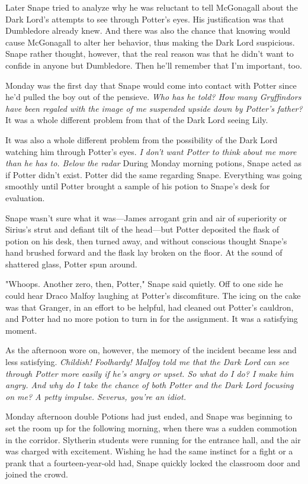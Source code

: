 Later Snape tried to analyze why he was reluctant to tell McGonagall about the Dark Lord's attempts to see through Potter's eyes. His justification was that Dumbledore already knew. And there was also the chance that knowing would cause McGonagall to alter her behavior, thus making the Dark Lord suspicious. Snape rather thought, however, that the real reason was that he didn't want to confide in anyone but Dumbledore. Then he'll remember that I'm important, too.

Monday was the first day that Snape would come into contact with Potter since he'd pulled the boy out of the pensieve. \emph{Who has he told? How many Gryffindors have been regaled with the image of me suspended upside down by Potter's father?} It was a whole different problem from that of the Dark Lord seeing Lily.

It was also a whole different problem from the possibility of the Dark Lord watching him through Potter's eyes. \emph{I don't want Potter to think about me more than he has to. Below the radar{\el}} During Monday morning potions, Snape acted as if Potter didn't exist. Potter did the same regarding Snape. Everything was going smoothly until Potter brought a sample of his potion to Snape's desk for evaluation.

Snape wasn't sure what it was—James arrogant grin and air of superiority or Sirius's strut and defiant tilt of the head—but Potter deposited the flask of potion on his desk, then turned away, and without conscious thought Snape's hand brushed forward and the flask lay broken on the floor. At the sound of shattered glass, Potter spun around.

"Whoops. Another zero, then, Potter," Snape said quietly. Off to one side he could hear Draco Malfoy laughing at Potter's discomfiture. The icing on the cake was that Granger, in an effort to be helpful, had cleaned out Potter's cauldron, and Potter had no more potion to turn in for the assignment. It was a satisfying moment.

As the afternoon wore on, however, the memory of the incident became less and less satisfying. \emph{Childish! Foolhardy! Malfoy told me that the Dark Lord can see through Potter more easily if he's angry or upset. So what do I do? I make him angry. And why do I take the chance of both Potter and the Dark Lord focusing on me? A petty impulse. Severus, you're an idiot.}

Monday afternoon double Potions had just ended, and Snape was beginning to set the room up for the following morning, when there was a sudden commotion in the corridor. Slytherin students were running for the entrance hall, and the air was charged with excitement. Wishing he had the same instinct for a fight or a prank that a fourteen-year-old had, Snape quickly locked the classroom door and joined the crowd.

